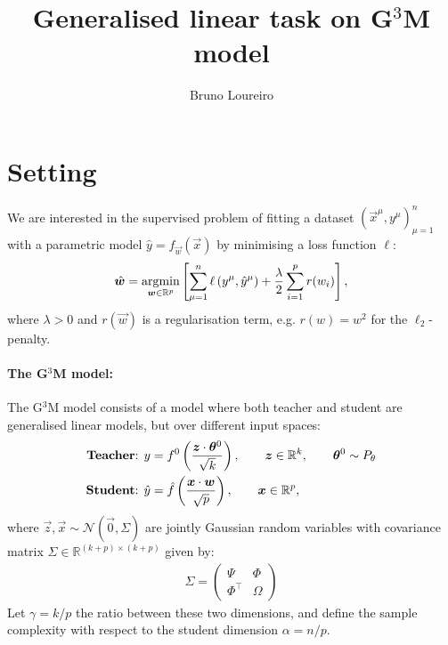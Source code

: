 \documentclass[11pt]{article}
\title{Generalised linear task on G$^3$M model}
\author{Bruno Loureiro}
\numberwithin{equation}{section}
\begin{document}
\maketitle
\tableofcontents

\section{Setting}
\label{sec:setting}
We are interested in the supervised problem of fitting a dataset $(\vec{x}^{\mu}, y^{\mu})_{\mu=1}^{n}$ with a parametric model $\hat{y} = f_{\vec{w}}(\vec{x})$ by minimising a loss function $\ell$:
\begin{align}
\hat{\vec{w}} = \underset{\vec{w}\in\mathbb{R}^{p}}{\argmin}\left[\sum\limits_{\mu=1}^{n}\ell\left(y^{\mu},\hat{y}^{\mu}\right)+\frac{\lambda}{2}\sum\limits_{i=1}^{p}r(w_{i})\right],
\label{eq:argmin}
\end{align}
\noindent where $\lambda>0$ and $r(\vec{w})$ is a regularisation term, e.g. $r(w) = w^2$ for the $\ell_2$-penalty.

\paragraph{The G$^3$M model:} The G$^3$M model consists of a model where both teacher and student are generalised linear models, but over different input spaces:
\begin{align}
\text{\textbf{Teacher}: } y &= f^{0}\left(\frac{\vec{z}\cdot \vec{\theta}^{0}}{\sqrt{k}}\right), \qquad \vec{z}\in\mathbb{R}^{k}, \qquad \vec{\theta}^{0}\sim P_{\theta} \\
\text{\textbf{Student}: }  \hat{y} &= \hat{f}\left(\frac{\vec{x}\cdot \vec{w}}{\sqrt{p}}\right), \qquad \vec{x}\in\mathbb{R}^{p}, 
\end{align}
\noindent where $\vec{z},\vec{x} \sim\mathcal{N}(\vec{0},\Sigma)$ are jointly Gaussian random variables with covariance matrix $\Sigma\in\mathbb{R}^{(k+p)\times(k+p)}$ given by:
\begin{align}
\Sigma = \begin{pmatrix}
 \Psi & \Phi\\
 \Phi^{\top} & \Omega	
 \end{pmatrix}
\end{align}
Let $\gamma = k/p$ the ratio between these two dimensions, and define the sample complexity with respect to the student dimension $\alpha = n/p$.

\end{document}
